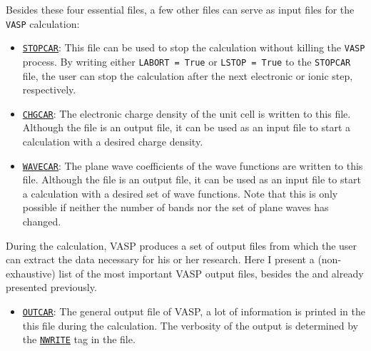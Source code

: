 \begin{refsection}
\begin{itemize}
\end{itemize}

Besides these four essential files, a few other files can serve as input files 
for the \texttt{VASP} calculation:

\begin{itemize}

 \label{appendix:sec-STOPCAR} 
\item \href{https://www.vasp.at/wiki/index.php/STOPCAR}{\texttt{STOPCAR}}:
This file can be used to stop the calculation without killing the \texttt{VASP} 
process. By writing either \texttt{LABORT = True} or \texttt{LSTOP = True} to 
the \texttt{STOPCAR} file, the user can stop the calculation after the next 
electronic or ionic step, respectively.

 \label{appendix:sec-CHGCAR} 
\item \href{https://www.vasp.at/wiki/index.php/CHGCAR}{\texttt{CHGCAR}}: 
The electronic charge density of the unit cell is written to this file. 
Although the file is an output file, it can be used as an input file to 
start a calculation with a desired charge density.

 \label{appendix:sec-WAVECAR} 
\item \href{https://www.vasp.at/wiki/index.php/WAVECAR}{\texttt{WAVECAR}}: 
The plane wave coefficients of the wave functions are written to this file. 
Although the file is an output file, it can be used as an input file to 
start a calculation with a desired set of wave functions. Note that this 
is only possible if neither the number of bands nor the set of plane waves 
has changed.

\end{itemize} 

During the calculation, VASP produces a set of output files from which the 
user can extract the data necessary for his or her research. Here I present a  
(non-exhaustive) list of the most important VASP output files, besides the 
 and  already presented previously.
 
\begin{itemize} 
 
 \label{appendix:sec-OUTCAR} 
\item \href{https://www.vasp.at/wiki/index.php/OUTCAR}{\texttt{OUTCAR}}: 
The general output file of VASP, a lot of information is printed in the this 
file during the calculation. The verbosity of the output is determined by the 
\href{https://www.vasp.at/wiki/index.php/NWRITE}{\texttt{NWRITE}} tag in the 
 file. 


\end{itemize}
\end{refsection}
